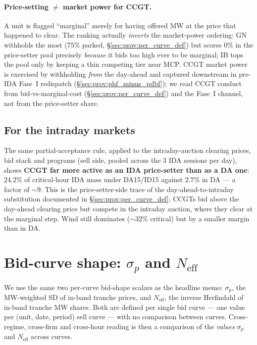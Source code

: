 \documentclass[11pt,a4paper]{article}
\begin{document}
\paragraph{Price-setting $\neq$ market power for CCGT.} A unit is flagged ``marginal'' merely for having offered MW at the price that happened to clear. The ranking actually \emph{inverts} the market-power ordering: GN withholds the most ($75\%$ parked, \S\ref{sec:prov:per_curve_def}) but scores $0\%$ in the price-setter pool precisely \emph{because} it bids too high ever to be marginal; IB tops the pool only by keeping a thin competing tier near MCP. CCGT market power is exercised by withholding \emph{from} the day-ahead and captured downstream in pre-IDA Fase~I redispatch (\S\ref{sec:prov:phf_minus_pdbf}); we read CCGT conduct from bid-vs-marginal-cost (\S\ref{sec:prov:per_curve_def}) and the Fase~I channel, not from the price-setter share.

\subsection{For the intraday markets}\label{sec:prov:pricesetter_ida}

\noindent The same partial-acceptance rule, applied to the intraday-auction clearing prices, bid stack and programs (sell side, pooled across the 3 IDA sessions per day), shows \textbf{CCGT far more active as an IDA price-setter than as a DA one}: $24.2\%$ of critical-hour IDA mass under DA15/ID15 against $2.7\%$ in DA --- a factor of $\sim 9$. This is the price-setter-side trace of the day-ahead-to-intraday substitution documented in \S\ref{sec:prov:per_curve_def}: CCGTs bid above the day-ahead clearing price but compete in the intraday auction, where they clear at the marginal step. Wind still dominates ($\sim 32\%$ critical) but by a smaller margin than in DA.


\section{Bid-curve shape: $\sigma_p$ and $N_{\text{eff}}$}\label{sec:prov:dw_decomp}

\noindent We use the same two per-curve bid-shape scalars as the headline memo: $\sigma_p$, the MW-weighted SD of in-band tranche prices, and $N_{\text{eff}}$, the inverse Herfindahl of in-band tranche MW shares. Both are defined per single bid curve --- one value per (unit, date, period) sell curve --- with no comparison between curves. Cross-regime, cross-firm and cross-hour reading is then a comparison of the \emph{values} $\sigma_p$ and $N_{\text{eff}}$ across curves.
\end{document}
